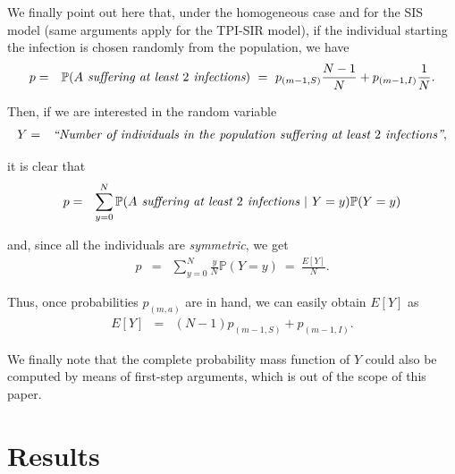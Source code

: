 \documentclass[preprint,12pt]{elsarticle}
\begin{document}
\par We finally point out here that, under the homogeneous case and for the SIS model (same arguments apply for the TPI-SIR
model), if the individual starting the infection is chosen randomly from the population, we have
\begin{eqnarray*}
p &=& \mathbb{P}(\hbox{\it $A$ suffering at least $2$ infections}) \ = \ p_{(m-1,S)}\frac{N-1}{N}+p_{(m-1,I)}\frac{1}{N}.
\end{eqnarray*}
\par\noindent Then, if we are interested in the random variable
\begin{eqnarray*}
 Y &=& \hbox{\it ``Number of individuals in the population suffering at least $2$ infections''},
\end{eqnarray*}
\par\noindent it is clear that
\begin{eqnarray*}
 p &=& \sum\limits_{y=0}^N\mathbb{P}(\hbox{\it $A$ suffering at least $2$ infections $|$ $Y=y$})\mathbb{P}(Y=y)
\end{eqnarray*}
\par\noindent and, since all the individuals are {\it symmetric}, we get
\begin{eqnarray*}
 p &=& \sum\limits_{y=0}^N\frac{y}{N}\mathbb{P}(Y=y) \ = \ \frac{E[Y]}{N}.
\end{eqnarray*}
\par\noindent Thus, once probabilities $p_{(m,a)}$ are in hand, we can easily obtain $E[Y]$ as
\begin{eqnarray*}
E[Y] &=& (N-1)p_{(m-1,S)}+p_{(m-1,I)}.
\end{eqnarray*}
\par\noindent We finally note that the complete probability mass function of $Y$ could also be computed by means of first-step arguments, which is out of the scope of this paper.


\section{Results}
\label{Sect3}
\end{document}
